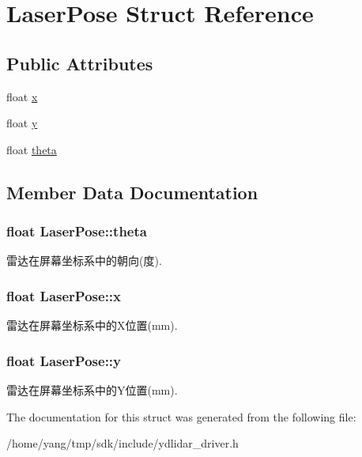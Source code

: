 \hypertarget{struct_laser_pose}{}\section{Laser\+Pose Struct Reference}
\label{struct_laser_pose}
\subsection*{Public Attributes}
\begin{DoxyCompactItemize}
\item 
float \hyperlink{struct_laser_pose_a80f6fbbc164fb2b3e8929778767797d6}{x}
\item 
float \hyperlink{struct_laser_pose_aaf1e1a4755babfaa45c64dd3e01b2c2d}{y}
\item 
float \hyperlink{struct_laser_pose_a666c69a4f946cfddd97b7627ae286dec}{theta}
\end{DoxyCompactItemize}


\subsection{Member Data Documentation}
\subsubsection[{\texorpdfstring{theta}{theta}}]{\setlength{\rightskip}{0pt plus 5cm}float Laser\+Pose\+::theta}\hypertarget{struct_laser_pose_a666c69a4f946cfddd97b7627ae286dec}{}\label{struct_laser_pose_a666c69a4f946cfddd97b7627ae286dec}
雷达在屏幕坐标系中的朝向(度). 
\subsubsection[{\texorpdfstring{x}{x}}]{\setlength{\rightskip}{0pt plus 5cm}float Laser\+Pose\+::x}\hypertarget{struct_laser_pose_a80f6fbbc164fb2b3e8929778767797d6}{}\label{struct_laser_pose_a80f6fbbc164fb2b3e8929778767797d6}
雷达在屏幕坐标系中的\+X位置(mm). 
\subsubsection[{\texorpdfstring{y}{y}}]{\setlength{\rightskip}{0pt plus 5cm}float Laser\+Pose\+::y}\hypertarget{struct_laser_pose_aaf1e1a4755babfaa45c64dd3e01b2c2d}{}\label{struct_laser_pose_aaf1e1a4755babfaa45c64dd3e01b2c2d}
雷达在屏幕坐标系中的\+Y位置(mm). 

The documentation for this struct was generated from the following file\+:\begin{DoxyCompactItemize}
\item 
/home/yang/tmp/sdk/include/ydlidar\+\_\+driver.\+h\end{DoxyCompactItemize}
